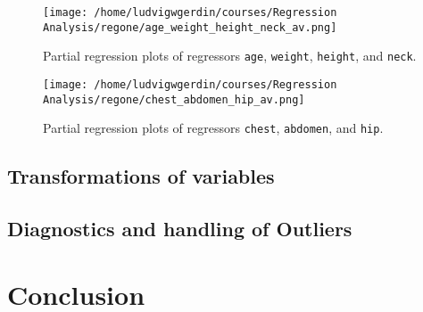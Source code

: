 \documentclass[11pt]{article}
\begin{document}
\begin{figure}[htbp]
\centering
\texttt{[image: /home/ludvigwgerdin/courses/Regression Analysis/regone/age\_weight\_height\_neck\_av.png]}
\caption{\label{fig:org96ebe9b}
Partial regression plots of regressors \texttt{age}, \texttt{weight}, \texttt{height}, and \texttt{neck}.}
\end{figure}

\begin{figure}[htbp]
\centering
\texttt{[image: /home/ludvigwgerdin/courses/Regression Analysis/regone/chest\_abdomen\_hip\_av.png]}
\caption{\label{fig:org75bb6a6}
Partial regression plots of regressors \texttt{chest}, \texttt{abdomen}, and \texttt{hip}.}
\end{figure}
\subsection{Transformations of variables}
\label{sec:org970d075}
\subsection{Diagnostics and handling of Outliers}
\label{sec:orgb86efca}
\section{Conclusion}
\label{sec:org06a2b47}


\end{document}
